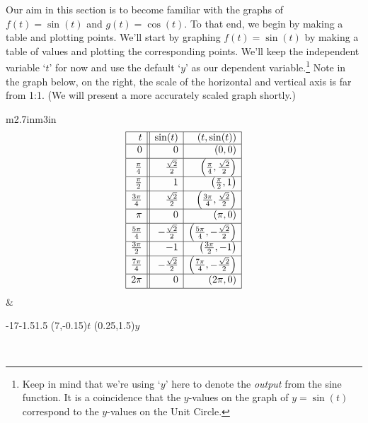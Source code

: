 \documentclass{ximera}
\begin{document}
\smallskip

Our aim in this section is to become familiar with the graphs of $f(t) = \sin(t)$ and $g(t) = \cos(t)$.  To that end, we begin by making a table and plotting points.  We'll start by graphing $f(t) = \sin(t)$ by making a table of values and plotting the corresponding points.  We'll keep the independent variable `$t$' for now and use the default `$y$' as our dependent variable.\footnote{Keep in mind that we're using `$y$' here to denote the \textit{output} from the sine function.  It is a coincidence that the $y$-values on the graph of $y=\sin(t)$ correspond to the $y$-values on the Unit Circle.}  Note in the graph below, on the right,  the scale of the horizontal and vertical axis is far from 1:1.  (We will present a more accurately scaled graph shortly.)


\hspace{.5in} \begin{tabular}{m{2.7in}m{3in}}
\setlength{\extrarowheight}{2pt}
\[ \begin{array}{|r||r|r|}  

\hline

 t & \sin(t) & (t,\sin(t)) \\ \hline
0  & 0 & (0, 0) \\ [2pt]   \hline
\frac{\pi}{4}  & \frac{\sqrt{2}}{2} & \left(\frac{\pi}{4}, \frac{\sqrt{2}}{2}\right) \\ [2pt] \hline 
\frac{\pi}{2}  & 1 & \left(\frac{\pi}{2}, 1\right) \\ [2pt] \hline 
\frac{3\pi}{4}  & \frac{\sqrt{2}}{2} & \left(\frac{3\pi}{4}, \frac{\sqrt{2}}{2}\right) \\ [2pt] \hline 
\pi & 0 & (\pi, 0) \\ [2pt] \hline 
\frac{5\pi}{4}  & -\frac{\sqrt{2}}{2} & \left(\frac{5\pi}{4}, -\frac{\sqrt{2}}{2}\right) \\ [2pt] \hline 
\frac{3\pi}{2}  & -1 & \left(\frac{3\pi}{2}, -1 \right) \\ [2pt] \hline 
\frac{7\pi}{4}  & -\frac{\sqrt{2}}{2} & \left(\frac{7\pi}{4}, -\frac{\sqrt{2}}{2}\right) \\ [2pt] \hline 
2\pi  & 0 & (2\pi, 0) \\  [2pt] \hline
\end{array} \] \setlength{\extrarowheight}{0pt} &

\begin{mfpic}[25][50]{-1}{7}{-1.5}{1.5}
\axes
\tlabel[cc](7,-0.15){\scriptsize $t$}
\tlabel[cc](0.25,1.5){\scriptsize $y$}
\tlpointsep{4pt}
\scriptsize
{}
\normalsize
{}
\penwd{1.1pt}
\end{mfpic} \\


\end{tabular}
\end{document}
